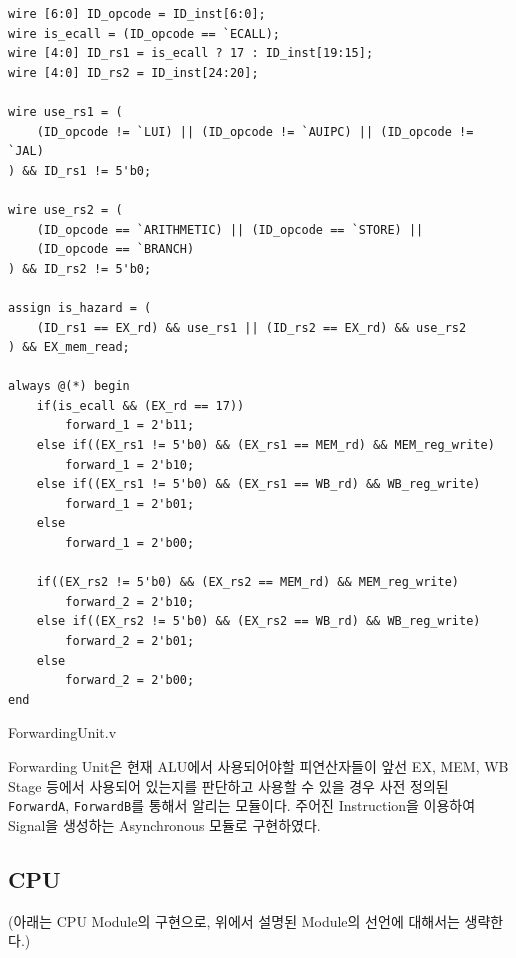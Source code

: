 \documentclass[openright, a4paper]{article}
\newcommand{\code}[1]{\texttt{#1}}
\newenvironment{longlisting}{\captionsetup{type=listing}}{}
\begin{document}
\begin{longlisting}
    \begin{verbatim}
wire [6:0] ID_opcode = ID_inst[6:0];
wire is_ecall = (ID_opcode == `ECALL);
wire [4:0] ID_rs1 = is_ecall ? 17 : ID_inst[19:15];
wire [4:0] ID_rs2 = ID_inst[24:20];

wire use_rs1 = (
    (ID_opcode != `LUI) || (ID_opcode != `AUIPC) || (ID_opcode != `JAL)
) && ID_rs1 != 5'b0; 

wire use_rs2 = (
    (ID_opcode == `ARITHMETIC) || (ID_opcode == `STORE) ||
    (ID_opcode == `BRANCH)
) && ID_rs2 != 5'b0;

assign is_hazard = (
    (ID_rs1 == EX_rd) && use_rs1 || (ID_rs2 == EX_rd) && use_rs2 
) && EX_mem_read;

always @(*) begin
    if(is_ecall && (EX_rd == 17))
        forward_1 = 2'b11;
    else if((EX_rs1 != 5'b0) && (EX_rs1 == MEM_rd) && MEM_reg_write)
        forward_1 = 2'b10;
    else if((EX_rs1 != 5'b0) && (EX_rs1 == WB_rd) && WB_reg_write)
        forward_1 = 2'b01;
    else
        forward_1 = 2'b00;

    if((EX_rs2 != 5'b0) && (EX_rs2 == MEM_rd) && MEM_reg_write)
        forward_2 = 2'b10;
    else if((EX_rs2 != 5'b0) && (EX_rs2 == WB_rd) && WB_reg_write)
        forward_2 = 2'b01;
    else
        forward_2 = 2'b00;
end
    \end{verbatim}
    \caption{ForwardingUnit.v}
\end{longlisting}

Forwarding Unit은 현재 ALU에서 사용되어야할 피연산자들이 앞선 EX, MEM, WB Stage 등에서 사용되어 있는지를 판단하고 사용할 수 있을 경우 사전 정의된 \code{ForwardA}, \code{ForwardB}를 통해서 알리는 모듈이다. 주어진 Instruction을 이용하여 Signal을 생성하는 Asynchronous 모듈로 구현하였다. \\

\subsection{CPU}

(아래는 CPU Module의 구현으로, 위에서 설명된 Module의 선언에 대해서는 생략한다.)
\end{document}
